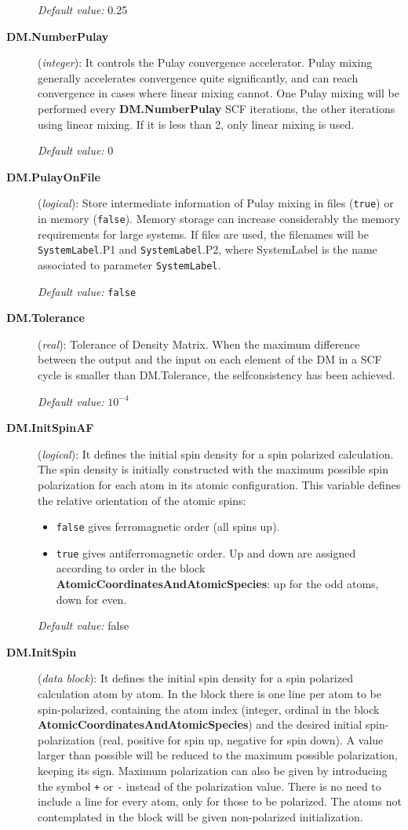 \begin{description}
{\it Default value:} 0.25

\item[{\bf DM.NumberPulay}] ({\it integer}): It controls the 
Pulay convergence accelerator. Pulay mixing generally
accelerates convergence quite significantly, and can
reach convergence in cases where linear mixing cannot.
One Pulay mixing will be performed every {\bf DM.NumberPulay} SCF
iterations, the other iterations using linear mixing. If 
it is less than 2, only linear mixing is used.

{\it Default value:} 0

\item[{\bf DM.PulayOnFile}] ({\it logical}): Store
intermediate information of Pulay mixing in files
({\tt true}) or in memory ({\tt false}).
Memory storage can increase considerably the
memory requirements for large systems.
If files are used, the filenames will be 
{\tt SystemLabel}.P1 and 
{\tt SystemLabel}.P2,
where SystemLabel is the name associated
to parameter {\tt SystemLabel}.

{\it Default value:} {\tt false}

\item[{\bf DM.Tolerance}] ({\it real}): Tolerance of Density Matrix.
When the maximum difference between the output and the
input on each element of the DM 
in a SCF cycle is smaller than DM.Tolerance,
the selfconsistency has been achieved.

{\it Default value:} $10^{-4}$

\item[{\bf DM.InitSpinAF}] ({\it logical}): It defines the 
initial spin density for a spin polarized calculation. The spin
density is initially constructed with the maximum possible
spin polarization for each atom in its atomic configuration.
This variable defines the relative orientation of the atomic
spins: 

\begin{itemize}
\item {\tt false} gives ferromagnetic order (all spins up).
\item {\tt true} gives antiferromagnetic order. Up and down are
assigned according to order in the block 
{\bf AtomicCoordinatesAndAtomicSpecies}: up for the odd atoms, down for even.
\end{itemize}

{\it Default value:} false


\item[{\bf DM.InitSpin}] ({\it data block}): It defines the
initial spin density for a spin polarized calculation atom by atom.
In the block there is one line per atom to be spin-polarized, 
containing the atom index (integer, ordinal in the block
{\bf AtomicCoordinatesAndAtomicSpecies}) and the desired
initial spin-polarization (real, positive for spin up, negative for
spin down). A value larger than possible will be reduced
to the maximum possible polarization, keeping its sign. 
Maximum polarization can also be given by introducing the
symbol {\tt +} or {\tt -} instead of the polarization value.
There is no need to include a line for every atom, only for
those to be polarized. The atoms not contemplated in the block will
be given non-polarized initialization.


\end{description}
